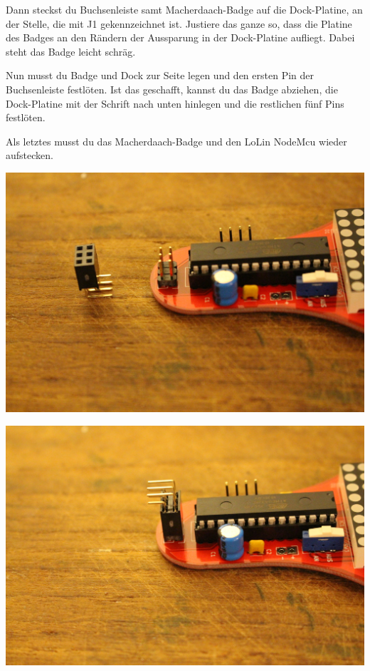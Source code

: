 \documentclass{article}
\begin{document}
Dann steckst du Buchsenleiste samt Macherdaach-Badge auf die Dock-Platine, an der Stelle, die mit J1 gekennzeichnet ist. Justiere das ganze so, dass die Platine des Badges an den Rändern der Aussparung in der Dock-Platine aufliegt. Dabei steht das Badge leicht schräg.

Nun musst du Badge und Dock zur Seite legen und den ersten Pin der Buchsenleiste festlöten. Ist das geschafft, kannst du das Badge abziehen, die Dock-Platine mit der Schrift nach unten hinlegen und die restlichen fünf Pins festlöten.

Als letztes musst du das Macherdaach-Badge und den LoLin NodeMcu wieder aufstecken.

\vspace{1cm}

\begin{minipage}[b]{0.5\textwidth}
	\includegraphics[width=\textwidth]{Bilder2019/IMG_6482.JPG}
\end{minipage}
\begin{minipage}[b]{0.5\textwidth}
	\includegraphics[width=\textwidth]{Bilder2019/IMG_6483.JPG}
\end{minipage}
\end{document}
